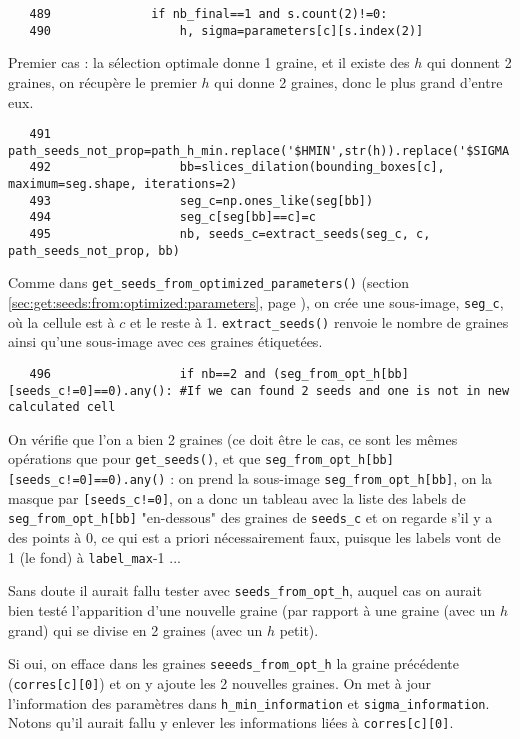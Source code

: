 \documentclass{article}
\def \mycolor {red}
\begin{document}
\color{black}
\begin{verbatim} 
   489	            if nb_final==1 and s.count(2)!=0:
   490	                h, sigma=parameters[c][s.index(2)]
\end{verbatim} 
\color{\mycolor}
Premier cas : la s\'election optimale donne 1 graine, et il existe des $h$ qui donnent 2 graines, on r\'ecup\`ere le premier $h$ qui donne 2 graines, donc le plus grand d'entre eux.
\color{black}
\begin{verbatim} 
   491	                path_seeds_not_prop=path_h_min.replace('$HMIN',str(h)).replace('$SIGMA',str(sigma));
   492	                bb=slices_dilation(bounding_boxes[c], maximum=seg.shape, iterations=2)
   493	                seg_c=np.ones_like(seg[bb])
   494	                seg_c[seg[bb]==c]=c
   495	                nb, seeds_c=extract_seeds(seg_c, c, path_seeds_not_prop, bb)
\end{verbatim} 
\color{\mycolor}
Comme dans \texttt{get\_seeds\_from\_optimized\_parameters()} (section \ref{sec:get:seeds:from:optimized:parameters}, page \pageref{sec:get:seeds:from:optimized:parameters}), on cr\'ee une sous-image, \verb|seg_c|, o\`u la cellule est \`a $c$ et le reste \`a 1.
\texttt{extract\_seeds()} renvoie le nombre de graines ainsi qu'une sous-image avec ces graines \'etiquet\'ees. 
\color{black}
\begin{verbatim} 
   496	                if nb==2 and (seg_from_opt_h[bb][seeds_c!=0]==0).any(): #If we can found 2 seeds and one is not in new calculated cell
\end{verbatim} 
\color{\mycolor}
On v\'erifie que l'on a bien 2 graines (ce doit \^etre le cas, ce sont les m\^emes op\'erations que pour \texttt{get\_seeds()}, et que \verb|seg_from_opt_h[bb][seeds_c!=0]==0).any()| : on prend la sous-image \verb|seg_from_opt_h[bb]|, on la masque par \verb|[seeds_c!=0]|, on a donc un tableau avec la liste des labels de  \verb|seg_from_opt_h[bb]| "en-dessous" des graines de \verb|seeds_c| et on regarde s'il y a des points \`a 0, ce qui est a priori n\'ecessairement faux, puisque les labels vont de 1 (le fond) \`a \verb|label_max|-1 ...

Sans doute il aurait fallu tester avec \verb|seeds_from_opt_h|, auquel cas on aurait bien test\'e l'apparition d'une nouvelle graine (par rapport \`a une graine (avec un $h$ grand) qui se divise en 2 graines (avec un $h$ petit).

Si oui, on efface dans les graines  \verb|seeeds_from_opt_h| la graine pr\'ec\'edente (\verb|corres[c][0]|) et on y ajoute les 2 nouvelles graines. On met \`a jour l'information des param\`etres dans \verb|h_min_information| et \verb|sigma_information|. Notons qu'il aurait fallu y enlever les informations li\'ees \`a \verb|corres[c][0]|.
\end{document}
